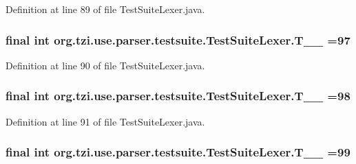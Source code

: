 Definition at line 89 of file Test\-Suite\-Lexer.\-java.

\hypertarget{classorg_1_1tzi_1_1use_1_1parser_1_1testsuite_1_1_test_suite_lexer_a8919797f6df37121ef16768a83fe4880}{
\subsubsection[{T\-\_\-\-\_\-97}]{\setlength{\rightskip}{0pt plus 5cm}final int org.\-tzi.\-use.\-parser.\-testsuite.\-Test\-Suite\-Lexer.\-T\-\_\-\-\_ =97\hspace{0.3cm}{\ttfamily [static]}}}\label{classorg_1_1tzi_1_1use_1_1parser_1_1testsuite_1_1_test_suite_lexer_a8919797f6df37121ef16768a83fe4880}


Definition at line 90 of file Test\-Suite\-Lexer.\-java.

\hypertarget{classorg_1_1tzi_1_1use_1_1parser_1_1testsuite_1_1_test_suite_lexer_ae2d66eb81eb9a2ebbd308c7bcc8590af}{
\subsubsection[{T\-\_\-\-\_\-98}]{\setlength{\rightskip}{0pt plus 5cm}final int org.\-tzi.\-use.\-parser.\-testsuite.\-Test\-Suite\-Lexer.\-T\-\_\-\-\_ =98\hspace{0.3cm}{\ttfamily [static]}}}\label{classorg_1_1tzi_1_1use_1_1parser_1_1testsuite_1_1_test_suite_lexer_ae2d66eb81eb9a2ebbd308c7bcc8590af}


Definition at line 91 of file Test\-Suite\-Lexer.\-java.

\hypertarget{classorg_1_1tzi_1_1use_1_1parser_1_1testsuite_1_1_test_suite_lexer_a37a2e5eba6cddf98e2469fde6e7639f6}{
\subsubsection[{T\-\_\-\-\_\-99}]{\setlength{\rightskip}{0pt plus 5cm}final int org.\-tzi.\-use.\-parser.\-testsuite.\-Test\-Suite\-Lexer.\-T\-\_\-\-\_ =99\hspace{0.3cm}{\ttfamily [static]}}}\label{classorg_1_1tzi_1_1use_1_1parser_1_1testsuite_1_1_test_suite_lexer_a37a2e5eba6cddf98e2469fde6e7639f6}


